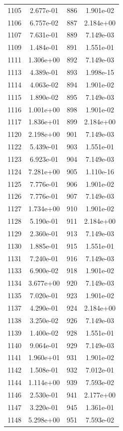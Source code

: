 \documentclass[12pt]{article}
\begin{document}
\begin{longtable}{@{}cccc@{}}
1105 & 2.677e-01 & 886 & 1.901e-02 \\
1106 & 6.757e-02 & 887 & 2.184e+00 \\
1107 & 7.631e-01 & 889 & 7.149e-03 \\
1109 & 1.484e-01 & 891 & 1.551e-01 \\
1111 & 1.306e+00 & 892 & 7.149e-03 \\
1113 & 4.389e-01 & 893 & 1.998e-15 \\
1114 & 4.063e-02 & 894 & 1.901e-02 \\
1115 & 1.890e-02 & 895 & 7.149e-03 \\
1116 & 1.001e+00 & 898 & 1.901e-02 \\
1117 & 1.836e+01 & 899 & 2.184e+00 \\
1120 & 2.198e+00 & 901 & 7.149e-03 \\
1122 & 5.439e-01 & 903 & 1.551e-01 \\
1123 & 6.923e-01 & 904 & 7.149e-03 \\
1124 & 7.281e+00 & 905 & 1.110e-16 \\
1125 & 7.776e-01 & 906 & 1.901e-02 \\
1126 & 7.776e-01 & 907 & 7.149e-03 \\
1127 & 1.734e+00 & 910 & 1.901e-02 \\
1128 & 5.190e-01 & 911 & 2.184e+00 \\
1129 & 2.360e-01 & 913 & 7.149e-03 \\
1130 & 1.885e-01 & 915 & 1.551e-01 \\
1131 & 7.240e-01 & 916 & 7.149e-03 \\
1133 & 6.900e-02 & 918 & 1.901e-02 \\
1134 & 3.677e+00 & 920 & 7.149e-03 \\
1135 & 7.020e-01 & 923 & 1.901e-02 \\
1137 & 4.290e-01 & 924 & 2.184e+00 \\
1138 & 3.250e-02 & 926 & 7.149e-03 \\
1139 & 1.400e-02 & 928 & 1.551e-01 \\
1140 & 9.064e-01 & 929 & 7.149e-03 \\
1141 & 1.960e+01 & 931 & 1.901e-02 \\
1142 & 1.508e-01 & 932 & 7.012e-01 \\
1144 & 1.114e+00 & 939 & 7.593e-02 \\
1146 & 2.530e-01 & 941 & 2.177e+00 \\
1147 & 3.220e-01 & 945 & 1.361e-01 \\
1148 & 5.298e+00 & 951 & 7.593e-02 \\

\end{longtable}
\end{document}
